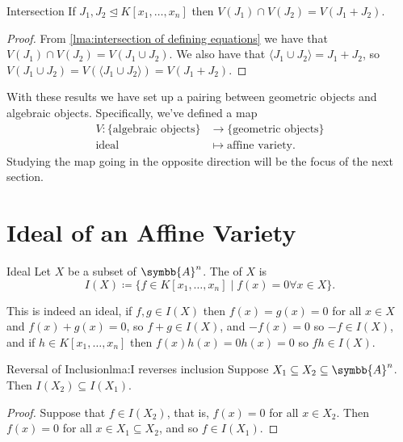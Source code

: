 \documentclass[fleqn]{NotesClass}
\newcommand{\subideal}{\trianglelefteq}
\newcommand{\affine}{\symbb{A}}
\begin{document}
    \begin{lma}{Intersection}{}
        If \(J_1, J_2 \subideal K[x_1, \dotsc, x_n]\) then \(V(J_1) \cap V(J_2) = V(J_1 + J_2)\).
        \begin{proof}
            From \cref{lma:intersection of defining equations} we have that \(V(J_1) \cap V(J_2) = V(J_1 \cup J_2)\).
            We also have that \(\langle J_1 \cup J_2 \rangle = J_1 + J_2\), so \(V(J_1 \cup J_2) = V(\langle J_1 \cup J_2 \rangle) = V(J_1 + J_2)\).
        \end{proof}
    \end{lma}
    
    \begin{remark}{}{}
        With these results we have set up a pairing between geometric objects and algebraic objects.
        Specifically, we've defined a map
        \begin{align}
            V \colon \{\text{algebraic objects}\} &\to \{\text{geometric objects}\}\\
            \text{ideal} &\mapsto \text{affine variety}.
        \end{align}
        Studying the map going in the opposite direction will be the focus of the next section.
    \end{remark}
    
    \section{Ideal of an Affine Variety}
    \begin{dfn}{Ideal}{}
        Let \(X\) be a subset of \(\affine^n\).
        The  of \(X\) is
        \begin{equation}
            I(X) \coloneq \{f \in K[x_1, \dotsc, x_n] \mid f(x) = 0 \forall x \in X\}.
        \end{equation}
    \end{dfn}
    
    This is indeed an ideal, if \(f, g \in I(X)\) then \(f(x) = g(x) = 0\) for all \(x \in X\) and \(f(x) + g(x) = 0\), so \(f + g \in I(X)\), and \(-f(x) = 0\) so \(-f \in I(X)\), and if \(h \in K[x_1,\dotsc, x_n]\) then \(f(x)h(x) = 0h(x) = 0\) so \(fh \in I(X)\).
    
    \begin{lma}{Reversal of Inclusion}{lma:I reverses inclusion}
        Suppose \(X_1 \subseteq X_2 \subseteq \affine^n\).
        Then \(I(X_2) \subseteq I(X_1)\).
        \begin{proof}
            Suppose that \(f \in I(X_2)\), that is, \(f(x) = 0\) for all \(x \in X_2\).
            Then \(f(x) = 0\) for all \(x \in X_1 \subseteq X_2\), and so \(f \in I(X_1)\).
        \end{proof}
    \end{lma}
    
\end{document}

